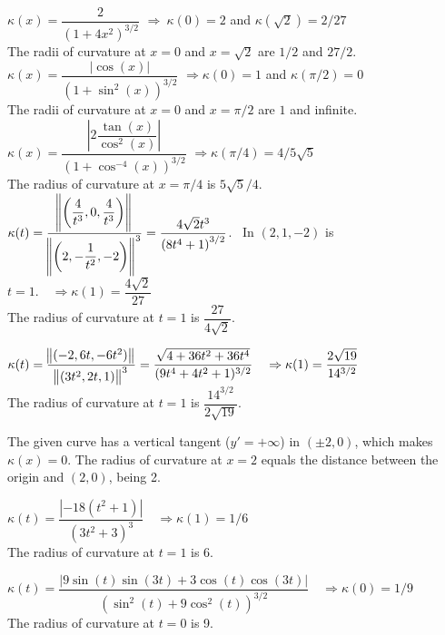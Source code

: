 \begin{Answer}
    
         \Question 
         $\kappa (x) = \dfrac{2}{(1+4x^2)^{3/2}}$ \quad $\Rightarrow \ \kappa (0) = 2$ \quad and \quad $\kappa (\sqrt{2}) = 2/27$ \\[0.2cm]
         The radii of curvature at $x=0$ and $x=\sqrt{2}$ are $1/2$ and $27/2$.
         \Question 
         $\kappa (x) = \dfrac{|\cos(x)|}{(1+\sin^2 (x))^{3/2}}$ \quad $\Rightarrow \kappa (0) = 1$ \quad and \quad $\kappa (\pi/2) = 0$ \\[0.2cm]
         The radii of curvature at $x=0$ and $x=\pi/2$ are $1$ and infinite.
         \Question $\kappa (x) = \dfrac{\left|2\dfrac{\tan(x)}{\cos^2(x)}\right|}{(1+\cos^{-4} (x))^{3/2}}$ \quad $\Rightarrow \kappa (\pi/4) = 4/5\sqrt{5}$ \\[0.2cm]
         The radius of curvature at $x=\pi/4$ is $5\sqrt{5}/4$.
         \Question 
         $\kappa (t) = \dfrac{\norm{\left( \dfrac{4}{t^3} , 0, \dfrac{4}{t^3} \right)}}{\norm{\left( 2 , -\dfrac{1}{t^2}, -2 \right) }^3} = \dfrac{4\sqrt{2}t^3}{\left(8t^4 + 1\right)^{3/2}}$. \ 
         In $(2,1,-2)$ is $t=1. \quad  \Rightarrow \kappa(1)= \dfrac{4 \sqrt{2}}{27}$ \\[0.2cm] The radius of curvature at $t=1$ is $\dfrac{27}{4 \sqrt{2}}$.
         
         \Question 
         $\kappa (t) = \dfrac{\norm{(-2,6t,-6t^2)}}{\norm{(3t^2,2t,1)}^3} = \dfrac{\sqrt{4 + 36 t^2 + 36 t^4}}{(9t^4+4t^2+1)^{3/2}}\quad \Rightarrow \kappa (1) = \dfrac{2 \sqrt{19}}{14^{3/2}}$ \\[0.2cm]
         The radius of curvature at $t=1$ is $\dfrac{14^{3/2}}{2 \sqrt{19}}$.
         
        \Question 
        The given curve has a vertical tangent ($y'=+\infty$) in $(\pm 2,0)$, which makes  $\kappa (x) = 0$. The radius of curvature at $x=2$ equals the distance between the origin and $(2,0)$, being 2.
        
        \Question 
         $\kappa (t) = \dfrac{|-18(t^2+1)|}{(3t^2+3)^3} \quad \Rightarrow \kappa (1) = 1/6$ \\[0.2cm]
         The radius of curvature at $t=1$ is $6$.

        \Question $\kappa (t) = \dfrac{\left|9\sin(t)\sin(3t) + 3 \cos(t)\cos(3t)\right|}{\left(\sin^2(t)+9 \cos^2(t) \right)^{3/2}} \quad \Rightarrow \kappa (0) = 1/9$ \\[0.2cm]
        The radius of curvature at $t=0$ is 9.
     
     
\end{Answer}
  
